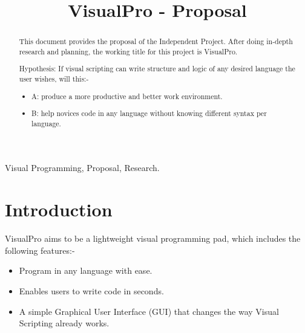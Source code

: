 \documentclass[conference]{IEEEtran}
\begin{document}
	\title{VisualPro - Proposal}

	\author{
	}

     \maketitle
    
    \thispagestyle{plain}
    \pagestyle{plain}
    
    \tableofcontents
    \newpage
    \begin{abstract}
    \label{abstract}
      This document provides the proposal of the Independent Project. After doing in-depth research and planning, the working title for this project is VisualPro.

      Hypothesis: If visual scripting can write structure and logic of any desired language the user wishes, will this:-
        \begin{itemize}
          \item A: produce a more productive and better work environment.
          \item B: help novices code in any language without knowing different syntax per language.
        \end{itemize}
    \end{abstract}

    \begin{IEEEkeywords}
        Visual Programming, Proposal, Research.
    \end{IEEEkeywords}

    \section{Introduction}
    \label{sec:Introduction}
      VisualPro aims to be a lightweight visual programming pad, which includes the following features:-
      \begin{itemize}
        \item Program in any language with ease.
        \item Enables users to write code in seconds.
        \item A simple Graphical User Interface (GUI) that changes the way Visual Scripting already works.
      \end{itemize}
  
\end{document}
